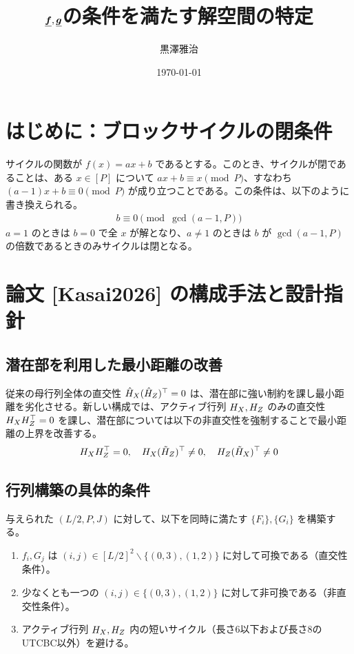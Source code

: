 \documentclass[a4paper,11pt,dvipdfmx]{jsarticle}
\theoremstyle{definition}
\begin{document}
\title{$\underline{\bm{f}}, \underline{\bm{g}}$の条件を満たす解空間の特定}
\author{黒澤雅治}
\date{\today}
\maketitle
\clearpage

\section{はじめに：ブロックサイクルの閉条件}
サイクルの関数が $f(x)=ax+b$ であるとする。このとき、サイクルが閉であることは、ある $x\in[P]$ について $ax+b \equiv x \pmod P$、すなわち $(a-1)x+b \equiv 0 \pmod P$ が成り立つことである。この条件は、以下のように書き換えられる。
\begin{align}
  b \equiv 0 \pmod{\gcd(a-1, P)} \label{eq:cbc}
\end{align}
$a=1$ のときは $b=0$ で全 $x$ が解となり、$a\neq 1$ のときは $b$ が $\gcd(a-1, P)$ の倍数であるときのみサイクルは閉となる。

\section{論文 [Kasai2026] の構成手法と設計指針}
\subsection{潜在部を利用した最小距離の改善}
従来の母行列全体の直交性 $\hat{H}_X(\hat{H}_Z)^\top=0$ は、潜在部に強い制約を課し最小距離を劣化させる。新しい構成では、アクティブ行列 $H_X, H_Z$ のみの直交性 $H_XH_Z^\top=0$ を課し、潜在部については以下の非直交性を強制することで最小距離の上界を改善する。
\begin{align}
H_XH_Z^\top = 0,\quad H_X(\tilde{H}_Z)^\top \neq 0, \quad H_Z(\tilde{H}_X)^\top \neq 0 
\end{align}

\subsection{行列構築の具体的条件}
与えられた $(L/2, P, J)$ に対して、以下を同時に満たす $\{F_i\}, \{G_i\}$ を構築する。
\begin{enumerate}[label=\Alph*, ref=\Alph*]
  \item $f_i, G_j$ は $(i,j)\in[L/2]^2\backslash\{(0,3), (1,2)\}$ に対して可換である（直交性条件）。\label{cond:A}
  \item 少なくとも一つの $(i,j)\in\{(0,3), (1,2)\}$ に対して非可換である（非直交性条件）。\label{cond:B}
  \item アクティブ行列 $H_X, H_Z$ 内の短いサイクル（長さ6以下および長さ8のUTCBC以外）を避ける。\label{cond:C}
\end{enumerate}
\end{document}
